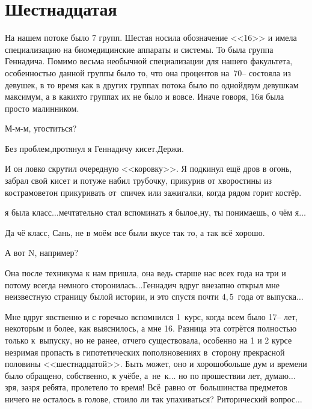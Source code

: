 \newpage
\section*{Шестнадцатая}

На нашем потоке было 7 групп. Шестая носила обозначение <<16>> и имела специализацию на биомедицинские аппараты и системы. То была группа Геннадича. Помимо весьма необычной специализации для нашего факультета, особенностью данной группы было то, что она процентов на~70\thinspace\nobreakdash-- состояла из девушек, в то время как в других группах потока было по одной\sdash двум девушкам максимум, а в каких\sdash то группах их не было и вовсе. Иначе говоря, 16\sdash я была просто малинником.


\diagdash М-м-м, угоститься?

\diagdash Без проблем,\mdash протянул я Геннадичу кисет.\mdash Держи.

И он ловко скрутил очередную <<коровку>>. Я подкинул ещё дров в огонь, забрал свой кисет и потуже набил трубочку, прикурив от хворостины из костра\mdash моветон прикуривать от~спичек или зажигалки, когда рядом горит костёр.

\sdash я была класс$\ldots$\mdash мечтательно стал вспоминать я былое,\mdash ну, ты понимаешь, о чём я$\ldots$

\diagdash Да чё класс, Сань, не в моём все были вкусе так то, а так всё хорошо.

\diagdash А вот N, например? 

\diagdash Она после техникума к нам пришла, она ведь старше нас всех года на три и потому всегда немного сторонилась$\ldots$\mdash Геннадич вдруг внезапно открыл мне неизвестную страницу былой истории, и это спустя почти $4,5$~года от выпуска$\ldots$

Мне вдруг явственно и с горечью вспомнился 1~курс, когда всем было 17\thinspace\nobreakdash-- лет, некоторым и более, как выяснилось, а мне 16. Разница эта сотрётся полностью только к~выпуску, но не ранее, отчего существовала, особенно на 1 и 2 курсе незримая пропасть в гипотетических поползновениях в~сторону прекрасной половины <<шестнадцатой>>. Быть может, оно и хорошо\mdash больше дум и времени было обращено, собственно, к учёбе, а~не~к$\ldots$ но по прошествии лет, думаю$\ldots$ зря, зазря ребята, пролетело то время! Всё~равно от~большинства предметов ничего не осталось в голове, стоило ли так упахиваться? Риторический вопрос$\ldots$

